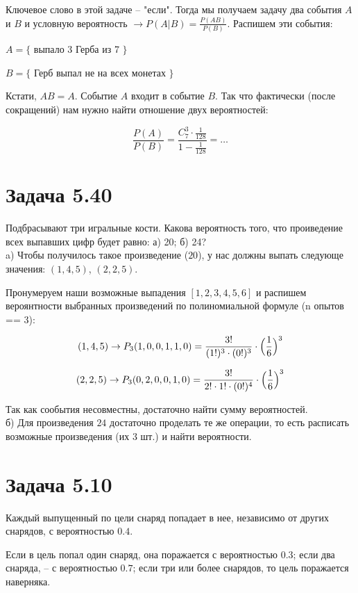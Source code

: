 \documentclass{article}
\begin{document}
Ключевое слово в этой задаче -- "если". Тогда мы получаем задачу два события $A$ и $B$ и условную вероятность $\rightarrow P(A|B) = \frac{P(AB)}{P(B)}$. Распишем эти события:

$A = \{$ выпало 3 Герба из 7 $\}$

$B = \{$ Герб выпал не на всех монетах $\}$

Кстати, $AB = A$. Событие $A$ входит в событие $B$. Так что фактически (после сокращений) нам нужно найти отношение двух вероятностей:

$$\frac{P(A)}{P(B)} = \frac{C_7^3 \cdot \frac{1}{128}}{1 - \frac{1}{128}} = \ldots$$

\section{Задача 5.40}

Подбрасывают три игральные кости. Какова вероятность того, что проиведение всех выпавших цифр будет равно: а) 20; б) 24?
\\

a) Чтобы получилось такое произведение ($20$), у нас должны выпать следующе значения:  $(1, 4, 5)$, $(2, 2, 5)$.

Пронумеруем наши возможные выпадения $[1, 2, 3, 4, 5, 6]$ и распишем вероянтности выбранных произведений по полиномиальной формуле (n опытов == 3):

$$(1, 4, 5) \rightarrow P_3(1, 0, 0, 1, 1, 0) = \frac{3!}{(1!)^3\cdot(0!)^3}\cdot \Bigl(\frac{1}{6}\Bigr)^3$$

$$(2, 2, 5) \rightarrow P_3(0, 2, 0, 0, 1, 0) = \frac{3!}{2!\cdot 1!\cdot(0!)^4}\cdot \Bigl(\frac{1}{6}\Bigr)^3$$

Так как сообытия несовместны, достаточно найти сумму вероятностей.
\\

б) Для произведения $24$ достаточно проделать те же операции, то есть расписать возможные произведения (их 3 шт.) и найти вероятности.

\section{Задача 5.10}

Каждый выпущенный по цели снаряд попадает в нее, независимо от других снарядов, с вероятностью $0.4$.

Если в цель попал один снаряд, она поражается с вероятностью $0.3$; если два снаряда, -- с вероятностью $0.7$; если три или более снарядов, то цель поражается наверняка.
\end{document}
